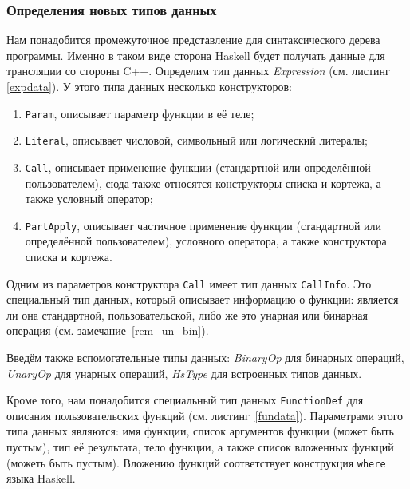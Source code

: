 		\subsubsection{Определения новых типов данных}
		Нам понадобится промежуточное представление для синтаксического дерева программы. Именно в таком виде сторона Haskell будет получать данные для трансляции со стороны C++. Определим тип данных \textit{Expression} (см. листинг \ref{expdata}). У этого типа данных несколько конструкторов:
		\begin{enumerate}[1)]
			\item \lstinline!Param!, описывает параметр функции в её теле;
			\item \lstinline!Literal!, описывает числовой, символьный или логический литералы;
			\item \lstinline!Call!, описывает применение функции (стандартной или определённой пользователем), сюда также относятся конструкторы списка и кортежа, а также условный оператор;
			\item \lstinline!PartApply!, описывает частичное применение функции (стандартной или определённой пользователем), условного оператора, а также конструктора списка и кортежа.			
		\end{enumerate}
		Одним из параметров конструктора \lstinline!Call! имеет тип данных \lstinline!CallInfo!. Это специальный тип данных, который описывает информацию о функции: является ли она стандартной, пользовательской, либо же это унарная или бинарная операция (см. замечание~\ref{rem_un_bin}). 
		
		Введём также вспомогательные типы данных: \textit{BinaryOp} для бинарных операций, \textit{UnaryOp} для унарных операций, \textit{HsType} для встроенных типов данных.

\label{rem_un_bin}

		Кроме того, нам понадобится специальный тип данных \lstinline!FunctionDef! для описания пользовательских функций (см. листинг~\ref{fundata}). Параметрами этого типа данных являются: имя функции, список аргументов функции (может быть пустым), тип её результата, тело функции, а также список вложенных функций (можеть быть пустым). Вложению функций соответствует конструкция \lstinline!where! языка Haskell.
		
